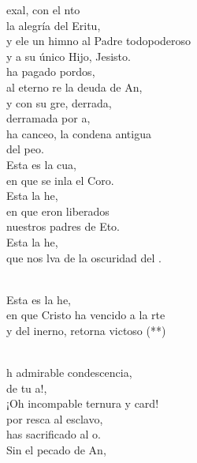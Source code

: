 \begin{cancion}
	exal, con el nto \\
	la alegría del Eritu, \\
	y ele un himno al Padre todopoderoso\\
	y a su único Hijo, Jesisto.\\
\jump
	 ha pagado pordos,\\
	al eterno re la deuda de An,\\
	y con su gre, derrada,\\
	derramada por a,\\
	ha canceo, la condena antigua\\
	del peo.\\
\jump
	Esta es la cua,\\
	en que se inla el Coro.\\
	Esta  la he,\\
	en que eron liberados\\
	nuestros padres de Eto.\\
	Esta  la he,\\
	que nos lva de la oscuridad del .\\\jump\\
	\begin{chorus}%
	Esta es la he,\\
	en que Cristo ha vencido a la rte\\
	y del inerno, retorna victoso (**)\\
	\end{chorus}%
	\jump\\
	h admirable condescencia,\\
	de tu a!,\\
	¡Oh incompable ternura y card!\\
	por resca al esclavo,\\
	has sacrificado al o.\\
	Sin el pecado de An,\\

\end{cancion}
